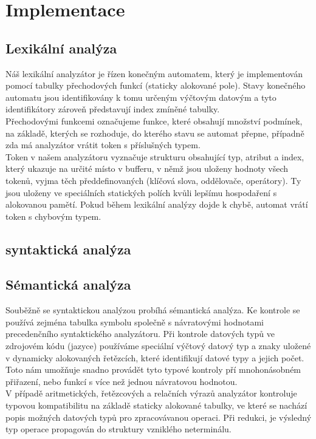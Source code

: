 \documentclass[11pt]{article}
\begin{document}
	\section{Implementace}
	
	\subsection{Lexikální analýza}
    	Náš lexikální analyzátor je řízen konečným automatem, který je implementován pomocí tabulky přechodových funkcí (staticky alokované pole). Stavy konečného automatu jsou identifikovány k tomu určeným výčtovým datovým a tyto identifikátory zároveň představují index zmíněné tabulky. \\
    	\indent Přechodovými funkcemi označujeme funkce, které obsahují množství podmínek, na základě, kterých se rozhoduje, do kterého stavu se automat přepne, případně zda má analyzátor vrátit token s příslušných typem. \\
     	\indent Token v našem analyzátoru vyznačuje strukturu obsahující typ, atribut a index, který ukazuje na  určité místo v bufferu, v němž jsou uloženy hodnoty všech tokenů, vyjma těch předdefinovaných (klíčová slova, oddělovače, operátory). Ty jsou uloženy ve speciálních statických polích kvůli lepšímu hospodaření s alokovanou pamětí. Pokud během lexikální analýzy dojde k chybě, automat vrátí token s chybovým typem. 

	\subsection{syntaktická analýza}
	
	\subsection{Sémantická analýza}
    	Souběžně se syntaktickou analýzou probíhá sémantická analýza. Ke kontrole se používá zejména tabulka symbolu společně s návratovými hodnotami precedenčního syntaktického analyzátoru. Při kontrole datových typů ve zdrojovém kódu (jazyce) používáme speciální výčtový datový typ a znaky uložené v dynamicky alokovaných řetězcích, které identifikují datové typy a jejich počet. Toto nám umožňuje snadno provádět tyto typové kontroly pří mnohonásobném přiřazení, nebo funkcí s více než jednou návratovou hodnotou. \\
    	\indent V případě aritmetických, řetězcových a relačních výrazů	 analyzátor kontroluje typovou kompatibilitu na základě staticky alokované tabulky, ve které se nachází popis možných datových typů pro zpracovávanou operaci. Při redukci, je výsledný typ operace propagován do struktury vzniklého neterminálu.
\end{document}
